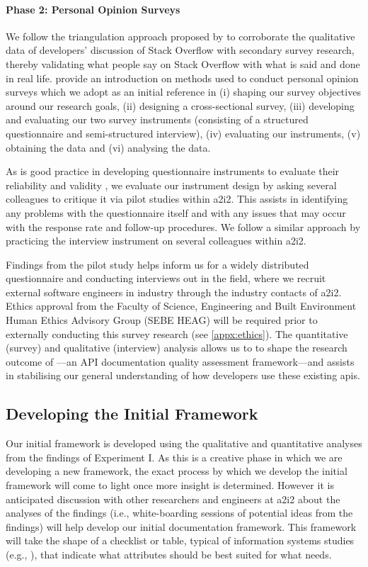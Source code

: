 \paragraph{Phase 2: Personal Opinion Surveys}
We follow the triangulation approach proposed by \citet{Jick:1979el} to corroborate the qualitative data of developers' discussion of Stack Overflow with secondary survey research, thereby validating what people say on Stack Overflow with what is said and done in real life. \citet{Kitchenham:2007ux} provide an introduction on methods used to conduct personal opinion surveys which we adopt as an initial reference in (i) shaping our survey objectives around our research goals, (ii) designing a cross-sectional survey, (iii) developing and evaluating our two survey instruments (consisting of a structured questionnaire and semi-structured interview), (iv) evaluating our instruments, (v) obtaining the data and (vi) analysing the data.

As is good practice in developing questionnaire instruments to evaluate their reliability and validity \citep{Litwin:1995wt}, we evaluate our instrument design by asking several colleagues to critique it via pilot studies within \gls{a2i2}. This assists in identifying any problems with the questionnaire itself and with any issues that may occur with the response rate and follow-up procedures. We follow a similar approach by practicing the interview instrument on several colleagues within \gls{a2i2}.

Findings from the pilot study helps inform us for a widely distributed questionnaire and conducting interviews out in the field, where we recruit external software engineers in industry through the industry contacts of \gls{a2i2}. Ethics approval from the Faculty of Science, Engineering and Built Environment Human Ethics Advisory Group (SEBE HEAG) will be required prior to externally conducting this survey research (see \cref{appx:ethics}). The quantitative (survey) and qualitative (interview) analysis allows us to to shape the research outcome of ---an API documentation quality assessment framework---and assists in stabilising our general understanding of how developers use these existing \glspl{api}.

\subsection{Developing the Initial Framework}

Our initial framework is developed using the qualitative and quantitative analyses from the findings of Experiment I. As this is a creative phase in which we are developing a new framework, the exact process by which we develop the initial framework will come to light once more insight is determined. However it is anticipated discussion with other researchers and engineers at \gls{a2i2} about the analyses of the findings (i.e., white-boarding sessions of potential ideas from the findings) will help develop our initial documentation framework. This framework will take the shape of a checklist or table, typical of information systems studies (e.g., \citep{Lau:1999vs}), that indicate what attributes should be best suited for what needs.

